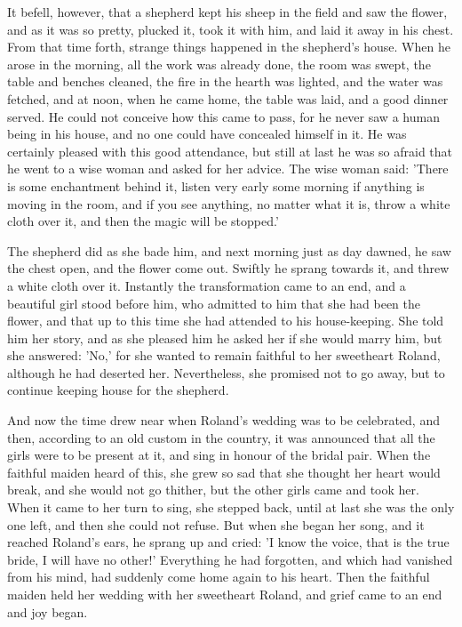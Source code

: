 \documentclass[12pt]{book}
\begin{document}
It befell, however, that a shepherd kept his sheep in the field and
saw the flower, and as it was so pretty, plucked it, took it with him,
and laid it away in his chest. From that time forth, strange things
happened in the shepherd's house. When he arose in the morning, all
the work was already done, the room was swept, the table and benches
cleaned, the fire in the hearth was lighted, and the water was
fetched, and at noon, when he came home, the table was laid, and a
good dinner served. He could not conceive how this came to pass, for
he never saw a human being in his house, and no one could have
concealed himself in it. He was certainly pleased with this good
attendance, but still at last he was so afraid that he went to a wise
woman and asked for her advice. The wise woman said: 'There is some
enchantment behind it, listen very early some morning if anything is
moving in the room, and if you see anything, no matter what it is,
throw a white cloth over it, and then the magic will be stopped.'

The shepherd did as she bade him, and next morning just as day dawned,
he saw the chest open, and the flower come out. Swiftly he sprang
towards it, and threw a white cloth over it. Instantly the
transformation came to an end, and a beautiful girl stood before him,
who admitted to him that she had been the flower, and that up to this
time she had attended to his house-keeping. She told him her story,
and as she pleased him he asked her if she would marry him, but she
answered: 'No,' for she wanted to remain faithful to her sweetheart
Roland, although he had deserted her. Nevertheless, she promised not
to go away, but to continue keeping house for the shepherd.

And now the time drew near when Roland's wedding was to be celebrated,
and then, according to an old custom in the country, it was announced
that all the girls were to be present at it, and sing in honour of the
bridal pair. When the faithful maiden heard of this, she grew so sad
that she thought her heart would break, and she would not go thither,
but the other girls came and took her. When it came to her turn to
sing, she stepped back, until at last she was the only one left, and
then she could not refuse. But when she began her song, and it reached
Roland's ears, he sprang up and cried: 'I know the voice, that is the
true bride, I will have no other!' Everything he had forgotten, and
which had vanished from his mind, had suddenly come home again to his
heart. Then the faithful maiden held her wedding with her sweetheart
Roland, and grief came to an end and joy began.
\end{document}
